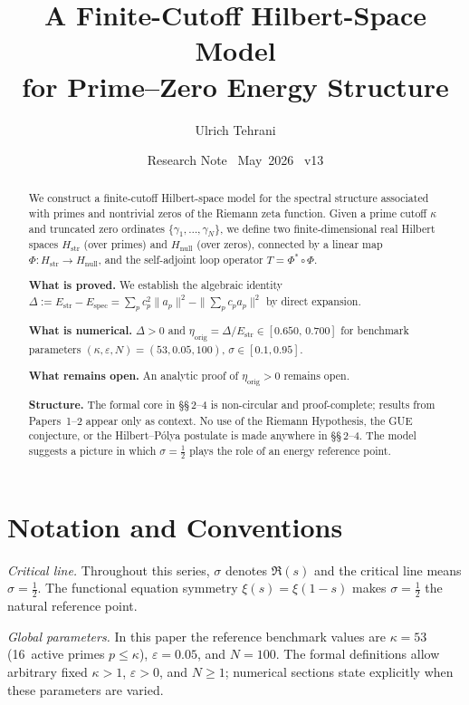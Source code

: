 \documentclass[11pt]{article}
\title{\vspace{-1.5em}\bfseries A Finite-Cutoff Hilbert-Space Model\\[0.4em]
\large for Prime--Zero Energy Structure}
\author{Ulrich Tehrani}
\date{Research Note \textperiodcentered\ May~2026 \textperiodcentered\ v13}
\newcommand{\Hstr}{H_{\mathrm{str}}}
\newcommand{\Hnull}{H_{\mathrm{null}}}
\newcommand{\Estr}{E_{\mathrm{str}}}
\newcommand{\Espec}{E_{\mathrm{spec}}}
\newcommand{\etaorig}{\eta_{\mathrm{orig}}}
\begin{document}
\maketitle

\begin{abstract}
We construct a finite-cutoff Hilbert-space model for the spectral structure
associated with primes and nontrivial zeros of the Riemann zeta function.
Given a prime cutoff $\kappa$ and truncated zero ordinates
$\{\gamma_1,\ldots,\gamma_N\}$, we define two finite-dimensional real
Hilbert spaces $\Hstr$ (over primes) and $\Hnull$ (over zeros),
connected by a linear map $\Phi\colon\Hstr\to\Hnull$, and the
self-adjoint loop operator $T = \Phi^*\circ\Phi$.

\textbf{What is proved.}
We establish the algebraic identity
$\Delta := \Estr - \Espec
 = \sum_p c_p^2\|a_p\|^2 - \|\sum_p c_p a_p\|^2$
by direct expansion.

\textbf{What is numerical.}
$\Delta > 0$ and
$\etaorig = \Delta/\Estr \in [0.650,\,0.700]$ for benchmark parameters
$(\kappa,\varepsilon,N)=(53,0.05,100)$, $\sigma\in[0.1,0.95]$.

\textbf{What remains open.}
An analytic proof of $\etaorig>0$ remains open.

\textbf{Structure.}
The formal core in \S\S\,2--4 is non-circular and proof-complete;
results from Papers~1--2 appear only as context.
No use of the Riemann Hypothesis, the GUE conjecture,
or the Hilbert--P\'olya postulate is made anywhere in \S\S\,2--4.
The model suggests a picture in which $\sigma=\tfrac12$ plays
the role of an energy reference point.
\end{abstract}

\vspace{2em}

\section*{Notation and Conventions}
\label{sec:notation}

\emph{Critical line.}
Throughout this series, $\sigma$ denotes $\Re(s)$ and the critical
line means $\sigma=\tfrac12$. The functional equation symmetry
$\xi(s)=\xi(1-s)$ makes $\sigma=\tfrac12$ the natural reference
point.

\medskip
\emph{Global parameters.}
In this paper the reference benchmark values are
$\kappa=53$ (16~active primes $p\leq\kappa$),
$\varepsilon=0.05$, and $N=100$.
The formal definitions allow arbitrary fixed $\kappa>1$,
$\varepsilon>0$, and $N\geq 1$; numerical sections state
explicitly when these parameters are varied.
\end{document}
